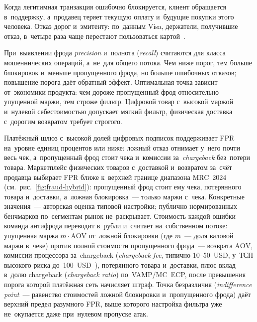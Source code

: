 Когда легитимная транзакция ошибочно блокируется, клиент обращается
в~поддержку, а~продавец теряет текущую оплату и~будущие покупки этого человека.
Отказ дорог и~эмитенту: по~данным Visa, держатели, получившие отказ,
в~четыре раза чаще перестают пользоваться картой~\cite{visa-auth-management-2020}.

При~выявлении фрода \textit{precision} и~полнота (\textit{recall}) считаются для
класса мошеннических операций, а~не~для общего потока. Чем ниже порог, тем
больше блокировок и~меньше пропущенного фрода, но больше ошибочных отказов; повышение порога даёт
обратный эффект. Оптимальная точка зависит от~экономики продукта: чем дороже
пропущенный фрод относительно упущенной маржи, тем строже фильтр. Цифровой
товар с~высокой маржой и~нулевой себестоимостью допускает мягкий фильтр,
физическая доставка с~дорогим возвратом требует строгого.

Платёжный шлюз с~высокой долей цифровых подписок поддерживает FPR
на~уровне единиц процентов или ниже: ложный отказ отнимает у~него почти весь
чек, а~пропущенный фрод стоит чека и~комиссии за~\textit{chargeback}
без~потери товара.
Маркетплейс физических товаров с~доставкой и~возвратом за~счёт продавца
выбирает FPR ближе к~верхней границе диапазона MRC~2024
(см.~рис.~\ref{fig:fraud-hybrid}): пропущенный фрод стоит ему чека,
потерянного товара и~доставки, а~ложная блокировка~--- только маржи с~чека. Конкретные значения~--- авторская
оценка типовой настройки; публично нормированных бенчмарков по~сегментам рынок
не~раскрывает. Стоимость каждой ошибки команда антифрода переводит в~рубли
и~считает на~собственном потоке: упущенная маржа $m \cdot \mathrm{AOV}$
от~ложной блокировки (где $m$~--- доля валовой маржи в~чеке) против полной
стоимости пропущенного фрода~--- возврата $\mathrm{AOV}$, комиссии процессора
за~chargeback (\textit{chargeback fee}, типично
10--50~USD, у~ТСП высокого риска до~100~USD~\cite{chargeback-fee-2024}), потерянного товара и~доставки, плюс
вклад в~долю chargeback (\textit{chargeback ratio}) по~VAMP/MC~ECP,
после превышения порога которой платёжная сеть начисляет штраф. Точка безразличия
(\textit{indifference point}~--- равенство стоимостей ложной
блокировки и~пропущенного фрода) даёт верхний предел разумного FPR, выше
которого настройка фильтра уже не~окупается даже при~нулевом пропуске атак.

